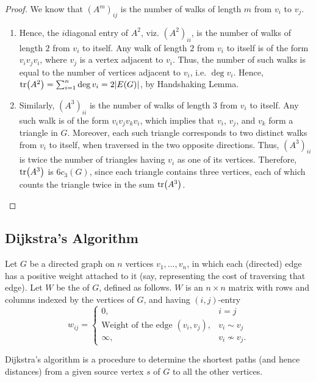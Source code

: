 \begin{proof}
We know that $(A^m)_{ij}$ is the number of walks of length $m$ from $v_i$ to $v_j$.
\begin{enumerate}[label=(\roman*)]
\item Hence, the $i$\nth diagonal entry of $A^2$, viz. $(A^2)_{ii}$, is the number of walks of length $2$ from $v_i$ to itself. Any walk of length $2$ from $v_i$ to itself is of the form $v_i v_j v_i$, where $v_j$ is a vertex adjacent to $v_i$. Thus, the number of such walks is equal to the number of vertices adjacent to $v_i$, i.e. $\deg v_i$. Hence, $\tr(A^2) = \sum_{i=1}^n \deg v_i = 2|E(G)|$, by Handshaking Lemma.

\item Similarly, $(A^3)_{ii}$ is the number of walks of length $3$ from $v_i$ to itself. Any such walk is of the form $v_i v_j v_k v_i$, which implies that $v_i$, $v_j$, and $v_k$ form a triangle in $G$. Moreover, each such triangle corresponds to two distinct walks from $v_i$ to itself, when traversed in the two opposite directions. Thus, $(A^3)_{ii}$ is twice the number of triangles having $v_i$ as one of its vertices. Therefore, $\tr(A^3)$ is $6 c_3(G)$, since each triangle contains three vertices, each of which counts the triangle twice in the sum $\tr(A^3)$.
\end{enumerate}
\end{proof}

\subsection{Dijkstra's Algorithm}\label{subsec:Dijkstra}

Let $G$ be a directed graph on $n$ vertices $v_1, \ldots, v_n$, in which each (directed) edge has a positive weight attached to it (say, representing the cost of traversing that edge). Let $W$ be the  of $G$, defined as follows. $W$ is an $n \times n$ matrix with rows and columns indexed by the vertices of $G$, and having $(i,j)$-entry
\begin{equation*}
w_{ij} = \begin{cases}
0, & i = j\\
\text{Weight of the edge $(v_i, v_j)$}, & v_i \sim v_j\\
\infty, & v_i \not\sim v_j.
\end{cases}
\end{equation*}

Dijkstra's algorithm is a procedure to determine the shortest paths (and hence distances) from a given source vertex $s$ of $G$ to all the other vertices. 

